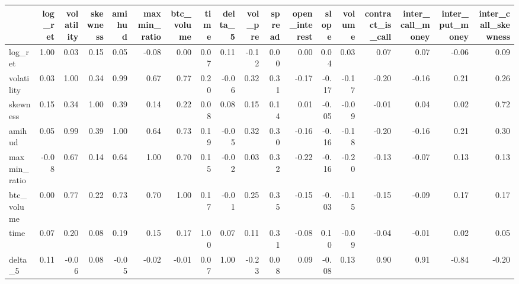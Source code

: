 \begin{tabular}{lrrrrrrrrrrrrrrrrr}
\toprule
{} &  log\_ret &  volatility &  skewness &  amihud &  maxmin\_ratio &  btc\_volume &  time &  delta\_5 &  vol\_pre &  spread &  open\_interest &  slope &  volume &  contract\_is\_call &  inter\_call\_money &  inter\_put\_money &  inter\_call\_skewness \\
\midrule
log\_ret             &     1.00 &        0.03 &      0.15 &    0.05 &         -0.08 &        0.00 &  0.07 &     0.11 &    -0.12 &    0.00 &           0.00 &   0.04 &    0.03 &              0.07 &              0.07 &            -0.06 &                 0.09 \\
volatility          &     0.03 &        1.00 &      0.34 &    0.99 &          0.67 &        0.77 &  0.20 &    -0.06 &     0.32 &    0.31 &          -0.17 &  -0.17 &   -0.17 &             -0.20 &             -0.16 &             0.21 &                 0.26 \\
skewness            &     0.15 &        0.34 &      1.00 &    0.39 &          0.14 &        0.22 &  0.08 &     0.08 &     0.15 &    0.14 &           0.01 &  -0.05 &   -0.09 &             -0.01 &              0.04 &             0.02 &                 0.72 \\
amihud              &     0.05 &        0.99 &      0.39 &    1.00 &          0.64 &        0.73 &  0.19 &    -0.05 &     0.32 &    0.30 &          -0.16 &  -0.16 &   -0.18 &             -0.20 &             -0.16 &             0.21 &                 0.30 \\
maxmin\_ratio        &    -0.08 &        0.67 &      0.14 &    0.64 &          1.00 &        0.70 &  0.15 &    -0.02 &     0.03 &    0.32 &          -0.22 &  -0.16 &   -0.20 &             -0.13 &             -0.07 &             0.13 &                 0.13 \\
btc\_volume          &     0.00 &        0.77 &      0.22 &    0.73 &          0.70 &        1.00 &  0.17 &    -0.01 &     0.25 &    0.35 &          -0.15 &  -0.03 &   -0.15 &             -0.15 &             -0.09 &             0.17 &                 0.17 \\
time                &     0.07 &        0.20 &      0.08 &    0.19 &          0.15 &        0.17 &  1.00 &     0.07 &     0.11 &    0.31 &          -0.08 &   0.10 &   -0.09 &             -0.04 &             -0.01 &             0.02 &                 0.05 \\
delta\_5             &     0.11 &       -0.06 &      0.08 &   -0.05 &         -0.02 &       -0.01 &  0.07 &     1.00 &    -0.23 &    0.08 &           0.09 &  -0.08 &    0.13 &              0.90 &              0.91 &            -0.84 &                -0.20 \\

\end{tabular}
